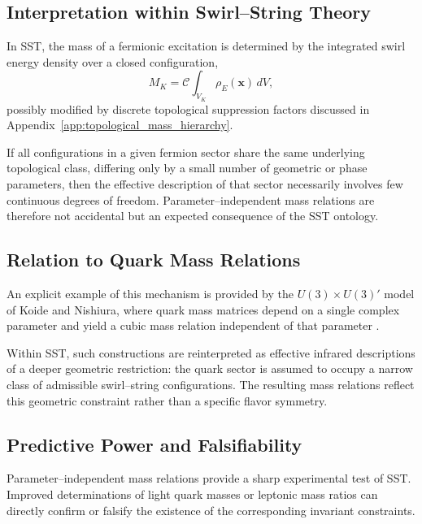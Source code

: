\documentclass[11pt]{article}
\begin{document}
    \subsection{Interpretation within Swirl--String Theory}

        In SST, the mass of a fermionic excitation is determined by the integrated swirl
        energy density over a closed configuration,
        \begin{equation}
            M_K = \mathcal{C}\int_{V_K}\rho_{\!E}(\mathbf{x})\,dV ,
        \end{equation}
        possibly modified by discrete topological suppression factors discussed in
        Appendix~\ref{app:topological_mass_hierarchy}.

        If all configurations in a given fermion sector share the same underlying
        topological class, differing only by a small number of geometric or phase
        parameters, then the effective description of that sector necessarily involves
        few continuous degrees of freedom.
        Parameter--independent mass relations are therefore not accidental but an
        expected consequence of the SST ontology.

    \subsection{Relation to Quark Mass Relations}

        An explicit example of this mechanism is provided by the
        $U(3)\times U(3)'$ model of Koide and Nishiura, where quark mass matrices depend
        on a single complex parameter and yield a cubic mass relation independent of
        that parameter \cite{KoideNishiura2018U3}.

        Within SST, such constructions are reinterpreted as effective infrared
        descriptions of a deeper geometric restriction: the quark sector is assumed to
        occupy a narrow class of admissible swirl--string configurations.
        The resulting mass relations reflect this geometric constraint rather than a
        specific flavor symmetry.

    \subsection{Predictive Power and Falsifiability}

        Parameter--independent mass relations provide a sharp experimental test of SST.
        Improved determinations of light quark masses or leptonic mass ratios can
        directly confirm or falsify the existence of the corresponding invariant
        constraints.
\end{document}
